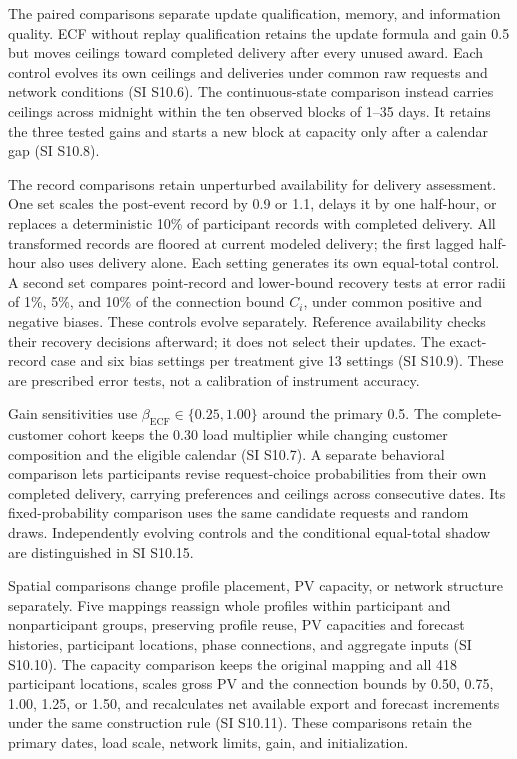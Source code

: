 \documentclass[twoside,twocolumn,9pt]{article}
\begin{document}
{The paired comparisons separate update qualification, memory, and information
quality. ECF without replay qualification retains the update formula and gain
0.5 but moves ceilings toward completed delivery after every unused award.
Each control evolves its own ceilings and deliveries under common raw requests
and network conditions (SI S10.6). The continuous-state comparison instead
carries ceilings across midnight within the ten observed blocks of 1--35 days.
It retains the three tested gains and starts a new block at capacity only
after a calendar gap (SI S10.8).

The record comparisons retain unperturbed availability for delivery assessment.
One set scales the post-event record by 0.9 or 1.1, delays it by one half-hour,
or replaces a deterministic 10\% of participant records with completed delivery.
All transformed records are floored at current modeled delivery; the first
lagged half-hour also uses delivery alone. Each setting generates its own
equal-total control. A second set compares point-record and lower-bound
recovery tests at error radii of 1\%, 5\%, and 10\% of the connection bound $C_i$,
under common positive and negative biases. These controls evolve separately.
Reference availability checks their recovery decisions afterward; it does
not select their updates. The exact-record case and six bias settings per
treatment give 13 settings (SI S10.9). These are prescribed error tests, not
a calibration of instrument accuracy.

Gain sensitivities use $\beta_{\mathrm{ECF}}\in\{0.25,1.00\}$ around the
primary 0.5. The complete-customer cohort keeps the 0.30 load multiplier
while changing customer composition and the eligible calendar (SI S10.7).
A separate behavioral comparison lets participants revise request-choice
probabilities from their own completed delivery, carrying preferences and
ceilings across consecutive dates. Its fixed-probability comparison uses the
same candidate requests and random draws. Independently evolving controls
and the conditional equal-total shadow are distinguished in SI S10.15.

Spatial comparisons change profile placement, PV capacity, or network
structure separately. Five mappings reassign whole profiles within participant
and nonparticipant groups, preserving profile reuse, PV capacities and forecast
histories, participant locations, phase connections, and aggregate inputs
(SI S10.10). The capacity comparison keeps the original mapping and all 418
participant locations, scales gross PV and the connection bounds by
0.50, 0.75, 1.00, 1.25, or 1.50, and recalculates net available export and
forecast increments under the same construction rule (SI S10.11).
These comparisons retain the primary dates, load scale, network limits,
gain, and initialization.

}
\end{document}
